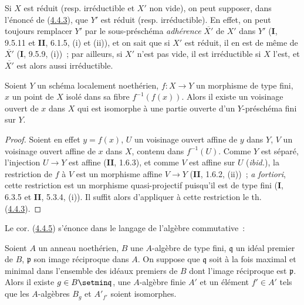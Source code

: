 \begin{remark}[4.4.4]
\label{III.4.4.4-fr}
Si $X$ est réduit (resp. irréductible et $X'$ non vide), on peut supposer,
dans l'énoncé de (\hyperref[III.4.4.3-fr]{4.4.3}), que $Y'$ est réduit (resp.
irréductible). En effet, on peut toujours remplacer $Y'$ par le
sous-préschéma \emph{adhérence} $\overline{X'}$ de $X'$ dans $Y'$ (\textbf{I}, 9.5.11 et
\textbf{II}, 6.1.5, (i) et (ii)), et on sait que si $X'$ est réduit, il en est de même
de $\overline{X'}$ (\textbf{I}, 9.5.9, (i))~; par ailleurs, si $X'$ n'est pas vide, il
est irréductible si $X$ l'est, et $\overline{X'}$ est alors aussi
irréductible.
\end{remark}

\begin{corollary}[4.4.5]
\label{III.4.4.5-fr}
Soient $Y$ un schéma localement noethérien, $f:X\to Y$ un morphisme de type
fini, $x$ un point de $X$ isolé dans sa fibre $f^{-1}(f(x))$. Alors il existe
un voisinage ouvert de $x$ dans $X$ qui est isomorphe à une partie ouverte
d'un $Y$-préschéma fini sur $Y$.
\end{corollary}

\begin{proof}
Soient en effet $y=f(x)$, $U$ un voisinage ouvert affine de $y$ dans $Y$,
$V$ un voisinage ouvert affine de $x$ dans $X$, contenu dans $f^{-1}(U)$.
Comme $Y$ est séparé, l'injection $U\to Y$ est affine (\textbf{II}, 1.6.3), et comme
$V$ est affine sur $U$ (\emph{ibid.}), la restriction de $f$ à $V$ est un
morphisme affine $V\to Y$ (\textbf{II}, 1.6.2, (ii))~; \emph{a fortiori}, cette
restriction est un morphisme quasi-projectif puisqu'il est de type fini
(\textbf{I}, 6.3.5 et \textbf{II}, 5.3.4, (i)). Il suffit alors d'appliquer à cette restriction
le th. (\hyperref[III.4.4.3-fr]{4.4.3}).
\end{proof}

Le cor. (\hyperref[III.4.4.5-fr]{4.4.5}) s'énonce dans le langage de
l'algèbre commutative~:


\begin{corollary}[4.4.6]
\label{III.4.4.6-fr}
Soient $A$ un anneau noethérien, $B$ une $A$-algèbre de type fini,
$\mathfrak q$ un idéal premier de $B$, $\mathfrak p$ son image réciproque
dans $A$. On suppose que $\mathfrak q$ soit à la fois maximal et minimal dans
l'ensemble des idéaux premiers de $B$ dont l'image réciproque est
$\mathfrak p$. Alors il existe $g\in B\setmin\mathfrak q$, une $A$-algèbre finie
$A'$ et un élément $f'\in A'$ tels que les $A$-algèbres $B_g$ et $A'_{f'}$
soient isomorphes.
\end{corollary}

